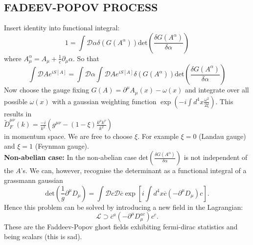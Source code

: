 \documentclass[a4paper, norsk, 8pt, landscape]{article}
\begin{document}
\begin{multicols*}{3}
\subsection*{\small  FADEEV-POPOV PROCESS}
Insert identity into functional integral: \\
\[
1 = \int \mathcal{D}\alpha \delta(G(A^\alpha))\text{det}\left(\frac{\delta G(A^\alpha)}{\delta \alpha}\right)
\]
where $A^\alpha_\mu = A_\mu + \frac{1}{e}\partial_\mu \alpha$.
So that \\
\[\int \mathcal{D}A e^{iS[A]}
= \int \mathcal{D}\alpha \int \mathcal{D}A e^{iS[A]} \delta(G(A^\alpha))\text{det}\left(\frac{\delta G(A^\alpha)}{\delta \alpha}\right)\]
Now choose the gauge fixing $G(A)=\partial^\mu A_\mu(x)-\omega(x)$ and integrate over all possible
$\omega(x)$ with a gaussian weighting function $\exp\left( -i\int d^4 x \frac{\omega^2}{2\xi} \right)$.
This results in \\
$\tilde{D}_F^{\mu \nu}(k)=\frac{-i}{k^2}(g^{\mu\nu}-(1-\xi)\frac{k^\mu k^\nu}{k^2})$\\
in momentum space. We are free to choose $\xi$.
For example $\xi=0$ (Landau gauge) and $\xi=1$ (Feynman gauge).
\\
 {\textbf{Non-abelian case:}}
In the non-abelian case $\text{det}\left(\frac{\delta G(A^\alpha)}{\delta \alpha}\right)$ is not independent of the $A$'s.
We can, however, recognise the determinant as a functional integral of a grassmann gaussian
\[
\text{det}\left(\frac{1}{g}\partial^\mu D_\mu \right)
=
\int \mathcal{D}c \mathcal{D}\overline{c} \exp \left[ i\int d^4x \overline{c}(-\partial^\mu D_\mu)c \right].
\]
Hence this problem
can be solved by introducing a new field in the Lagrangian: \\
\[
\mathcal{L} \supset
\overline{c}^a (-\partial^\mu D_\mu^{ac})c^c.
\]
These are the Faddeev-Popov ghost fields exhibiting fermi-dirac statistics and being scalars (this is sad).
















\end{multicols*}
\end{document}
